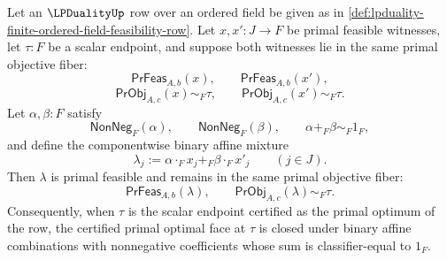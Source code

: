 \begin{theorem}
\label{thm:lpduality-optimal-primal-face-binary-convex-closure}
Let an $\LPDualityUp$ row over an ordered field be given as in \autoref{def:lpduality-finite-ordered-field-feasibility-row}. Let $x,x':J\to F$ be primal feasible witnesses, let $\tau:F$ be a scalar endpoint, and suppose both witnesses lie in the same primal objective fiber:
$$
\mathsf{PrFeas}_{A,b}(x),
\qquad
\mathsf{PrFeas}_{A,b}(x'),
$$
$$
\mathsf{PrObj}_{A,c}(x)\sim_F\tau,
\qquad
\mathsf{PrObj}_{A,c}(x')\sim_F\tau.
$$
Let $\alpha,\beta:F$ satisfy
$$
\mathsf{NonNeg}_F(\alpha),
\qquad
\mathsf{NonNeg}_F(\beta),
\qquad
\alpha+_F\beta\sim_F1_F,
$$
and define the componentwise binary affine mixture
$$
\lambda_j:=\alpha\cdot_F x_j+_F\beta\cdot_F x'_j
\qquad (j\in J).
$$
Then $\lambda$ is primal feasible and remains in the same primal objective fiber:
$$
\mathsf{PrFeas}_{A,b}(\lambda),
\qquad
\mathsf{PrObj}_{A,c}(\lambda)\sim_F\tau.
$$
Consequently, when $\tau$ is the scalar endpoint certified as the primal optimum of the row, the certified primal optimal face at $\tau$ is closed under binary affine combinations with nonnegative coefficients whose sum is classifier-equal to $1_F$.
\end{theorem}
